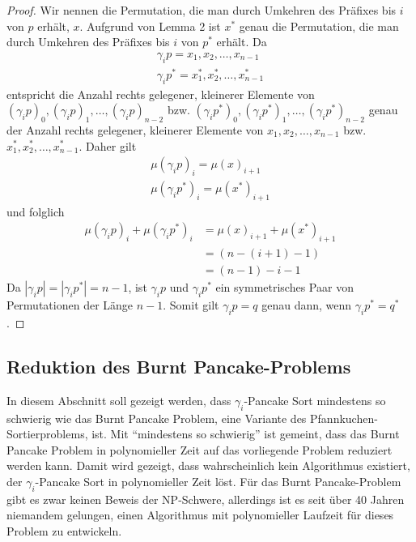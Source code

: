 \documentclass[a4paper, 11pt, ngerman]{article}
\begin{document}
\begin{proof}
    Wir nennen die Permutation, die man durch Umkehren des Präfixes bis $i$ von $p$ erhält, $x$. Aufgrund von Lemma 2 ist $x^*$ genau die Permutation, die man durch Umkehren des Präfixes bis $i$ von $p^*$ erhält.
    Da
    \begin{align*}
        \gamma_i p = x_1, x_2, \dots, x_{n-1} \\
        \gamma_i p^* = x^*_1, x^*_2, \dots, x^*_{n-1}
    \end{align*}
    entspricht die Anzahl rechts gelegener, kleinerer Elemente von $(\gamma_i p)_0, (\gamma_i p)_1, \dots, (\gamma_i p)_{n - 2}$ bzw. $(\gamma_i p^*)_0, (\gamma_i p^*)_1, \dots, (\gamma_i p^*)_{n - 2}$ genau der Anzahl rechts gelegener, kleinerer Elemente von $x_1, x_2, \dots, x_{n-1}$ bzw. $x^*_1, x^*_2, \dots, x^*_{n-1}$. Daher gilt
    \begin{align*}
        \mu(\gamma_i p)_i = \mu(x)_{i + 1} \\
        \mu(\gamma_i p^*)_i = \mu(x^*)_{i + 1}
    \end{align*}
    und folglich
    \begin{align*}
        \mu(\gamma_i p)_i + \mu(\gamma_i p^*)_i & = \mu(x)_{i + 1} + \mu(x^*)_{i + 1} \\
                                                & = (n - (i + 1) - 1)                 \\
                                                & = (n - 1) - i - 1
    \end{align*}
    Da $|\gamma_i p| = |\gamma_i p^*| = n - 1$, ist $\gamma_i p$ und $\gamma_i p^*$ ein symmetrisches Paar von Permutationen der Länge $n - 1$. Somit gilt $\gamma_i p = q$ genau dann, wenn $\gamma_i p^* = q^*$.
\end{proof}

\subsection{Reduktion des Burnt Pancake-Problems}

In diesem Abschnitt soll gezeigt werden, dass $\gamma_i$-Pancake Sort mindestens so schwierig wie das Burnt Pancake Problem, eine Variante des Pfannkuchen-Sortierproblems, ist. Mit ``mindestens so schwierig'' ist gemeint, dass das Burnt Pancake Problem in polynomieller Zeit auf das vorliegende Problem reduziert werden kann. Damit wird gezeigt, dass wahrscheinlich kein Algorithmus existiert, der $\gamma_i$-Pancake Sort in polynomieller Zeit löst. Für das Burnt Pancake-Problem gibt es zwar keinen Beweis der NP-Schwere, allerdings ist es seit über 40 Jahren niemandem gelungen, einen Algorithmus mit polynomieller Laufzeit für dieses Problem zu entwickeln.
\end{document}
